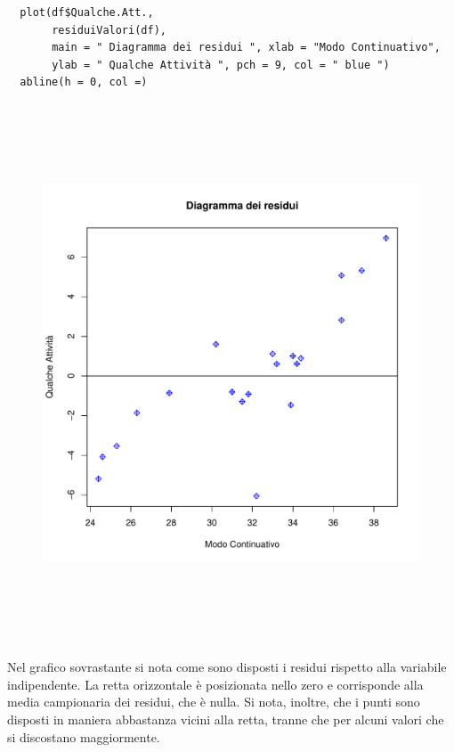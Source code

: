 \vspace{5mm}
\begin{lstlisting}
  plot(df$Qualche.Att.,
       residuiValori(df),
       main = " Diagramma dei residui ", xlab = "Modo Continuativo",
       ylab = " Qualche Attività ", pch = 9, col = " blue ")
  abline(h = 0, col =)
\end{lstlisting}
\vspace{5mm}

\vspace{5mm}
\begin{figure}[!htbp]
    \centering
    \includegraphics[height=16cm]{ProgettoSAD/capitoli/images/s_desc_biv/diagramma_residui.pdf}
\end{figure}
\vspace{5mm}

Nel grafico sovrastante si nota come sono disposti i residui rispetto alla variabile indipendente. La retta orizzontale è posizionata nello zero e corrisponde alla media campionaria dei residui, che è nulla. Si nota, inoltre, che i punti sono disposti in maniera abbastanza vicini alla retta, tranne che per alcuni valori che si discostano maggiormente.

